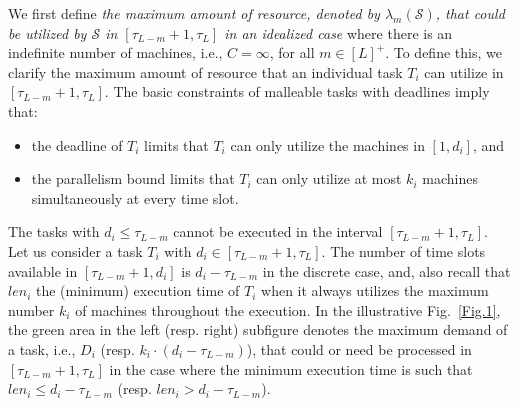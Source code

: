 \documentclass[10pt,journal,compsoc]{IEEEtran}
\begin{document}
We first define {\em the maximum amount of resource, denoted by $\lambda_{m}(\mathcal{S})$, that could be utilized by $\mathcal{S}$ in $[\tau_{L-m}+1, \tau_{L}]$ in an idealized case} where there is an indefinite number of machines, i.e., $C=\infty$, for all $m\in[L]^{+}$. To define this, we clarify the maximum amount of resource that an individual task $T_{i}$ can utilize in $[\tau_{L-m}+1, \tau_{L}]$. The basic constraints of malleable tasks with deadlines imply that:
\begin{itemize}
\item the deadline of $T_{i}$ limits that $T_{i}$ can only utilize the machines in $[1, d_{i}]$, and

\item the parallelism bound limits that $T_{i}$ can only utilize at most $k_{i}$ machines simultaneously at every time slot.
\end{itemize}
The tasks with $d_{i}\leq \tau_{L-m}$ cannot be executed in the interval $[\tau_{L-m}+1, \tau_{L}]$. Let us consider a task $T_{i}$ with $d_{i}\in [\tau_{L-m}+1, \tau_{L}]$. The number of time slots available in $[\tau_{L-m}+1, d_{i}]$ is $d_{i}-\tau_{L-m}$ in the discrete case, and, also recall that $len_{i}$ the (minimum) execution time of $T_{i}$ when it always utilizes the maximum number $k_{i}$ of machines throughout the execution. In the illustrative Fig.~\ref{Fig.1}, the green area in the left (resp. right) subfigure denotes the maximum demand of a task, i.e., $D_{i}$ (resp. $k_{i}\cdot(d_{i}-\tau_{L-m})$), that could or need be processed in $[\tau_{L-m}+1, \tau_{L}]$ in the case where the minimum execution time is such that $len_{i}\leq  d_{i}-\tau_{L-m}$ (resp. $len_{i} > d_{i}-\tau_{L-m}$).
\end{document}
